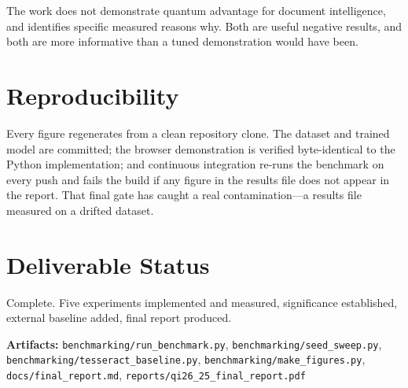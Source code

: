 \documentclass[11pt,a4paper]{article}
\begin{document}
The work does not demonstrate quantum advantage for document intelligence, and
identifies specific measured reasons why. Both are useful negative results, and
both are more informative than a tuned demonstration would have been.

\section{Reproducibility}

Every figure regenerates from a clean repository clone. The dataset and trained
model are committed; the browser demonstration is verified byte-identical to the
Python implementation; and continuous integration re-runs the benchmark on every
push and fails the build if any figure in the results file does not appear in the
report. That final gate has caught a real contamination---a results file measured
on a drifted dataset.

\section{Deliverable Status}

Complete. Five experiments implemented and measured, significance established,
external baseline added, final report produced.

\vspace{0.3cm}
\noindent\textbf{Artifacts:} \texttt{benchmarking/run\_benchmark.py},
\texttt{benchmarking/seed\_sweep.py}, \texttt{benchmarking/tesseract\_baseline.py},
\texttt{benchmarking/make\_figures.py}, \texttt{docs/final\_report.md},
\texttt{reports/qi26\_25\_final\_report.pdf}
\end{document}
